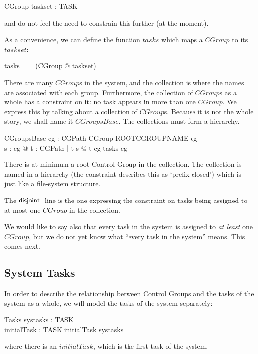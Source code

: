 \documentclass[a4paper,twoside,12pt]{article}
\begin{document}
\begin{schema}{CGroup}
taskset : \finset TASK
\end{schema}
and do not feel the need to constrain this further (at the moment).

As a convenience, we can define the function $tasks$ which maps a $CGroup$ to its $taskset$:
\begin{zed}
tasks == (\lambda CGroup @ taskset)
\end{zed}

There are many $CGroup$s in the system, and the collection is where the names are associated with each group. Furthermore, the collection of $CGroup$s as a whole has a constraint on it: no task appears in more than one $CGroup$. We express this by talking about a collection of $CGroup$s. Because it is not the whole story, we shall name it $CGroupsBase$. The collections must form a hierarchy.

\begin{schema}{CGroupsBase}
cg : CGPath \ffun CGroup
\where
ROOTCGROUPNAME \in \dom cg \\
\forall s : \dom cg @ \forall t : CGPath | t \subset s @ t \in \dom cg
\also
\disjoint tasks \circ cg
\end{schema}

There is at minimum a root Control Group in the collection.  The collection is named in a hierarchy (the constraint describes this as `prefix-closed') which is just like a file-system structure.

The ${\mathsf{disjoint}}\;$ line is the one expressing the constraint on tasks being assigned to at most one $CGroup$ in the collection.

We would like to say also that every task in the system is assigned to \emph{at least} one $CGroup$, but we do not yet know what ``every task in the system'' means. This comes next.

\subsection{System Tasks}
In order to describe the relationship between Control Groups and the tasks of the system as a whole, we will model the tasks of the system separately:

\begin{schema}{Tasks}
systasks : \finset TASK \\
initialTask : TASK
\where
initialTask \in systasks
\end{schema}
where there is an $initialTask$, which is the first task of the system.
\end{document}
